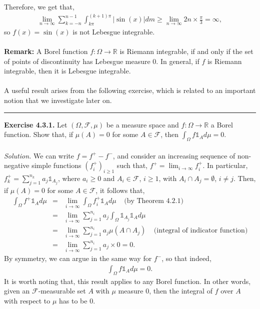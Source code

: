 \documentclass{article}
\begin{document}
Therefore, we get that,
\begin{eqnarray}
\nonumber
\lim_{n\to\infty}\sum_{k=-n}^{n-1}\int_{k\pi}^{(k+1)\pi}|\sin(x)| dm \geq \lim_{n \to \infty} 2n \times \frac{\pi}{3} = \infty,
\end{eqnarray}
so $f(x)=\sin(x)$ is not Lebesgue integrable.\\\\
\textbf{Remark:} A Borel function $f:\Omega \to \mathbb{R}$ is Riemann integrable, if and only if the set of points of discontinuity has Lebesgue measure $0$. In general, if $f$ is Riemann integrable, then it is Lebesgue integrable.\\\\
A useful result arises from the following exercise, which is related to an important notion that we investigate later on.
\begin{center}
	\noindent\rule{12cm}{0.4pt}
\end{center}
\textbf{Exercise 4.3.1.} Let $(\Omega, \mathcal{F}, \mu)$ be a measure space and $f:\Omega \to \mathbb{R}$ a Borel function. Show that, if $\mu(A) = 0$ for some $A\in\mathcal{F}$, then $\int_\Omega f\mathds{1}_A d\mu = 0$.\\\\
\textit{Solution.} We can write $f = f^+ - f^-$, and consider an increasing sequence of non-negative simple functions $(f_i^+)_{i\geq1}$ such that, $f^+ = \lim_{i\to\infty}f_i^+$. In particular, $f_k^+ = \sum_{j=1}^{n_k}a_j\mathds{1}_{A_j}$, where $a_i \geq 0$ and $A_i \in \mathcal{F}$, $i \geq 1$, with $A_i \cap A_j = \emptyset$, $i \neq j$. Then, if $\mu(A) = 0$ for some $A\in\mathcal{F}$, it follows that,
\begin{eqnarray}
\nonumber
\int_\Omega f^+ \mathds{1}_A d\mu &=& \lim_{i\to\infty} \int_\Omega f_i^+ \mathds{1}_A d\mu \ \ \ \ \ \text{(by Theorem 4.2.1)} \\
\nonumber
&=& \lim_{i\to\infty} \sum_{j=1}^{n_i} a_j \int_\Omega \mathds{1}_{A_j} \mathds{1}_A d\mu \\
\nonumber
&=& \lim_{i\to\infty} \sum_{j=1}^{n_i} a_j \mu(A \cap A_j) \ \ \ \ \ \text{(integral of indicator function)} \\
\nonumber
&=& \lim_{i\to\infty} \sum_{j=1}^{n_i} a_j \times 0 = 0.
\end{eqnarray}
By symmetry, we can argue in the same way for $f^-$, so that indeed,
\begin{eqnarray}
\nonumber
\int_\Omega f\mathds{1}_A d\mu = 0.
\end{eqnarray}
It is worth noting that, this result applies to any Borel function. In other words, given an $\mathcal{F}$-measurable set $A$ with $\mu$ measure $0$, then the integral of $f$ over $A$ with respect to $\mu$ has to be $0$.
\end{document}
